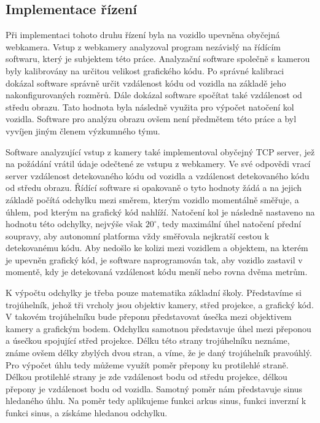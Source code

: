 \documentclass[czech, bachelor]{diploma}
\begin{document}
\subsection{Implementace řízení}

Při implementaci tohoto druhu řízení byla na vozidlo upevněna obyčejná webkamera. Vstup z webkamery analyzoval program nezávislý
na řídícím softwaru, který je subjektem této práce. Analyzační software společně s kamerou byly kalibrovány na určitou velikost
grafického kódu. Po správné kalibraci dokázal software správně určit vzdálenost kódu od vozidla na základě jeho nakonfigurovaných
rozměrů. Dále dokázal software spočítat také vzdálenost od středu obrazu. Tato hodnota byla následně využita pro výpočet natočení
kol vozidla. Software pro analýzu obrazu ovšem není předmětem této práce a byl vyvíjen jiným členem výzkumného týmu.

Software analyzující vstup z kamery také implementoval obyčejný TCP server, jež na požádání vrátil údaje odečtené ze vstupu
z webkamery. Ve své odpovědi vrací server vzdálenost detekovaného kódu od vozidla a vzdálenost detekovaného kódu od středu obrazu.
Řídící software si opakovaně o tyto hodnoty žádá a na jejich základě počítá odchylku mezi směrem, kterým vozidlo momentálně
směřuje, a úhlem, pod kterým na grafický kód nahlíží. Natočení kol je následně nastaveno na hodnotu této odchylky, nejvýše však
$20^{\circ}$, tedy maximální úhel natočení přední soupravy, aby autonomní platforma vždy směřovala nejkratší cestou k detekovanému
kódu. Aby nedošlo ke kolizi mezi vozidlem a objektem, na kterém je upevněn grafický kód, je software naprogramován tak, aby
vozidlo zastavil v momentě, kdy je detekovaná vzdálenost kódu menší nebo rovna dvěma metrům.

K výpočtu odchylky je třeba pouze matematika základní školy. Představíme si trojúhelník, jehož tři vrcholy jsou objektiv kamery,
střed projekce, a grafický kód. V takovém trojúhelníku bude přeponu představovat úsečka mezi objektivem kamery a grafickým bodem.
Odchylku samotnou představuje úhel mezi přeponou a úsečkou spojující střed projekce. Délku této strany trojúhelníku neznáme, známe
ovšem délky zbylých dvou stran, a víme, že je daný trojúhelník pravoúhlý. Pro výpočet úhlu tedy můžeme využít poměr přepony ku
protilehlé straně. Délkou protilehlé strany je zde vzdálenost bodu od středu projekce, délkou přepony je vzdálenost bodu
od vozidla. Samotný poměr nám představuje sinus hledaného úhlu. Na poměr tedy aplikujeme funkci arkus sinus, funkci inverzní k
funkci sinus, a získáme hledanou odchylku.
\end{document}
